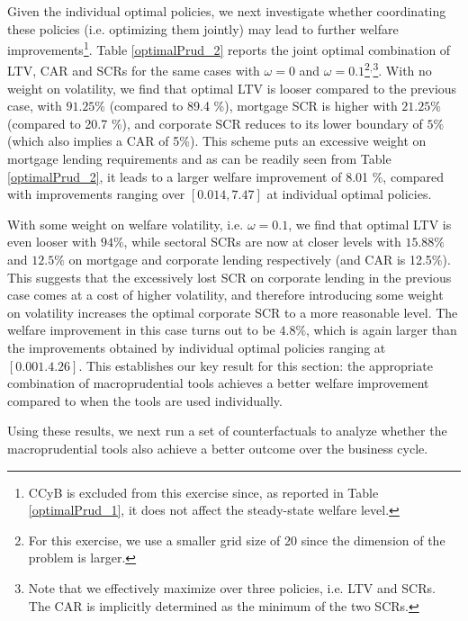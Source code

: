 \documentclass[12pt]{article}
\numberwithin{equation}{section}
\begin{document}
Given the individual optimal policies, we next investigate whether coordinating these policies (i.e. optimizing them jointly) may lead to further welfare improvements\footnote{CCyB is excluded from this exercise since, as reported in Table \ref{optimalPrud_1}, it does not affect the steady-state welfare level.}. Table \ref{optimalPrud_2} reports the joint optimal combination of LTV, CAR and SCRs for the same cases with $\omega=0$ and $\omega=0.1$\footnote{For this exercise, we use a smaller grid size of 20 since the dimension of the problem is larger.}$^{,}$\footnote{Note that we effectively maximize over three policies, i.e. LTV and SCRs. The CAR is implicitly determined as the minimum of the two SCRs. }. With no weight on volatility, we find that optimal LTV is  looser compared to the previous case, with $91.25 \%$ (compared to 89.4 \%), mortgage SCR is higher with $21.25 \%$ (compared to 20.7 \%), and corporate SCR reduces to its lower boundary of $5 \%$ (which also implies a CAR of 5\%). This scheme puts an excessive weight on mortgage lending requirements and as can be readily seen from Table \ref{optimalPrud_2}, it leads to a larger welfare improvement of 8.01 \%, compared with improvements ranging over $[0.014,7.47]$ at individual optimal policies. 

With some weight on welfare volatility, i.e. $\omega=0.1$, we find that optimal LTV is even looser with $ 94 \%$, while sectoral SCRs are now at closer levels with $15.88 \%$ and $12.5 \%$ on mortgage and corporate lending respectively (and CAR is 12.5\%). This suggests that the excessively lost SCR on corporate lending in the previous case comes at a cost of higher volatility, and therefore introducing some weight on volatility increases the optimal corporate SCR to a more reasonable level. The welfare improvement in this case turns out to be $4.8 \%$, which is again larger than the improvements obtained by individual optimal policies ranging at $[0.001.4.26]$. This establishes our key result for this section: the appropriate combination of macroprudential tools achieves a better welfare improvement compared to when the tools are used individually. 

Using these results, we next run a set of counterfactuals to analyze whether the macroprudential tools also achieve a better outcome over the business cycle. 
\end{document}
